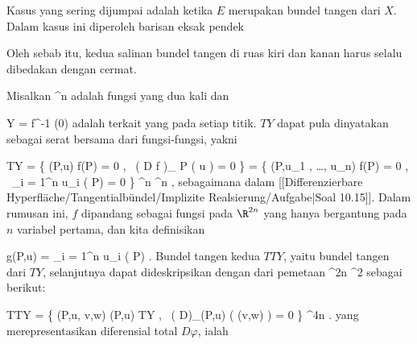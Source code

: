 Kasus yang sering dijumpai adalah ketika $E$ merupakan bundel tangen dari $X$. Dalam kasus ini diperoleh barisan eksak pendek

 {  }

Oleh sebab itu, kedua salinan bundel tangen di ruas kiri dan kanan harus selalu dibedakan dengan cermat.

{}
{

Misalkan
 {\R^n } { \R
} {}
adalah fungsi yang dua kali
dan

\mavergleichskette
{\vergleichskette
{ Y
}
{ = }{ f^{-1} (0)
}
{  }{
}
{    }{
}
{   }{
}
}
{}{}{}
adalah
terkait yang
pada setiap titik. 
$TY$ dapat pula dinyatakan sebagai serat bersama dari fungsi-fungsi, yakni

\mavergleichskettealignhandlinks
{\vergleichskettealignhandlinks
{ TY
}
{ =} { \left\{  (P,u)   \mid   f(P) = 0 , \,  \left(  D f   \right)_{ P } \left(  u  \right) = 0       \right\}
}
{ =} { \left\{  (P,u_1 , \ldots , u_n)   \mid   f(P) = 0 , \,  \sum_{i = 1}^n u_i {  } ( P) = 0       \right\}
}
{ \subseteq} { \R^n \times \R^n
}
{ } {
}
}
{}
{}{,}
sebagaimana dalam
[[Differenzierbare Hyperfläche/Tangentialbündel/Implizite Realsierung/Aufgabe|Soal 10.15]].
Dalam rumusan ini, $f$ dipandang sebagai fungsi pada $\R^{2n}$ yang hanya bergantung pada $n$ variabel pertama, dan kita definisikan

\mavergleichskettedisp
{\vergleichskette
{ g(P,u)
}
{ =} { \sum_{i = 1}^n u_i {  } ( P)
}
{ } {
}
{ } {
}
{ } {
}
}
{}{}{.}
Bundel tangen kedua $TTY$, yaitu bundel tangen dari $TY$, selanjutnya dapat dideskripsikan dengan
dari pemetaan
 {\R^{2n}} { \R^2
} {}
sebagai berikut:

\mavergleichskettealignhandlinks
{\vergleichskettealignhandlinks
{ TTY
}
{ =} { \left\{  (P,u, v,w)  \mid   (P,u) \in TY , \,  \left(  D\varphi  \right)_{(P,u)} \left(  (v,w)  \right) = 0       \right\}
}
{ \subseteq} { \R^{4n}
}
{ } {
}
{ } {}
}
{}
{}{.}
yang merepresentasikan diferensial total $D\varphi$, ialah

}
